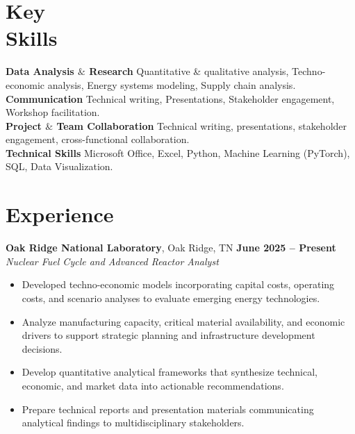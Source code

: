 \documentclass[margin,line]{resume}
\begin{document}
\begin{resume}
    \section{\mysidestyle Key\\Skills}
        \textbf{Data Analysis $\&$ Research} Quantitative \& qualitative analysis, Techno-economic analysis, Energy systems modeling, Supply chain analysis.\vspace{1mm}\\
        \textbf{Communication} Technical writing, Presentations, Stakeholder engagement, Workshop facilitation.\vspace{1mm}\\
        \textbf{Project $\&$ Team Collaboration} Technical writing, presentations, stakeholder engagement, cross-functional collaboration.\vspace{1mm}\\
        \textbf{Technical Skills} Microsoft Office, Excel, Python, Machine Learning (PyTorch), SQL, Data Visualization.\vspace{1mm}

    \section{\mysidestyle Experience}
    \textbf{Oak Ridge National Laboratory}, Oak Ridge, TN \hfill \textbf{June 2025 -- Present} \\
    \textsl{Nuclear Fuel Cycle and Advanced Reactor Analyst} \\
    \begin{itemize}
        \item Developed techno-economic models incorporating capital costs, operating costs, and scenario analyses to evaluate emerging energy technologies.
        \item Analyze manufacturing capacity, critical material availability, and economic drivers to support strategic planning and infrastructure development decisions.
        \item Develop quantitative analytical frameworks that synthesize technical, economic, and market data into actionable recommendations.
        \item Prepare technical reports and presentation materials communicating analytical findings to multidisciplinary stakeholders.
    \end{itemize}


\end{resume}
\end{document}
